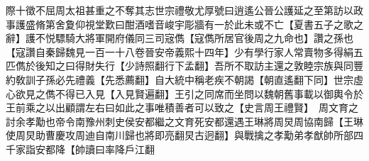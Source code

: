 際十徵不屈周太祖甚重之不奪其志世宗禮敬尤厚號曰逍遙公晉公護延之至第訪以政事護盛脩第舍夐仰視堂歎曰酣酒嗜音峻宇彫牆有一於此未或不亡【夏書五子之歌之辭】護不悦驃騎大將軍開府儀同三司宼儁【寇儁所居官後周之九命也】讚之孫也【寇讚自秦歸魏見一百一十八卷晉安帝義熙十四年】少有學行家人常賣物多得絹五匹儁於後知之曰得財失行【少詩照翻行下孟翻】吾所不取訪主還之敦睦宗族與同豐約敎訓子孫必先禮義【先悉薦翻】自大統中稱老疾不朝謁【朝直遙翻下同】世宗虛心欲見之儁不得已入見【入見賢遍翻】王引之同席而坐問以魏朝舊事載以御輿令於王前乘之以出顧謂左右曰如此之事唯積善者可以致之【史言周王禮賢】　周文育之討余孝勱也帝令南豫州刺史侯安都繼之文育死安都還遇王琳將周炅周協南歸【王琳使周炅助曹慶攻周迪自南川歸也將即亮翻炅古迥翻】與戰擒之孝勱弟孝猷帥所部四千家詣安都降【帥讀曰率降戶江翻